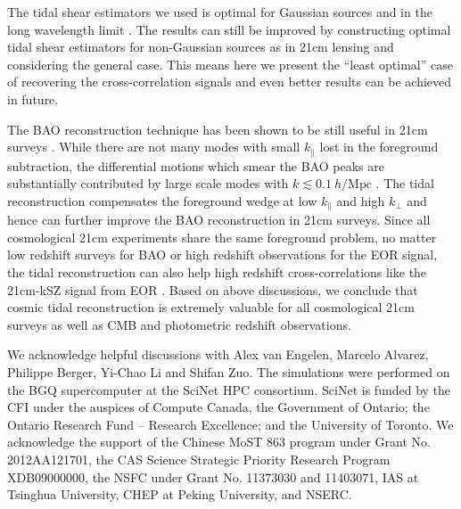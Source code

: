 \documentclass[aps,prl,twocolumn,showpacs,superscriptaddress,groupedaddress,nofootinbib]{revtex4}  %
\newcommand{\mr}{\mathrm}
\begin{document}
The tidal shear estimators we used is optimal for Gaussian sources and in the 
long wavelength limit \cite{2015:zhu}.
The results can still be improved by constructing optimal tidal shear 
estimators for non-Gaussian sources as in 21cm lensing \cite{2010:lu} and 
considering the general case. This means here we present the ``least optimal''
case of recovering the cross-correlation signals and even better results can be
achieved in future.

The BAO reconstruction technique \cite{2007:bao} has been shown to be still
useful in 21cm surveys \cite{2015:bao1}\cite{2015:bao2}. While there are not 
many modes with small $k_\parallel$ lost in the foreground subtraction, the 
differential motions which smear the BAO peaks are substantially contributed
by large scale modes with $k\lesssim0.1\ h/\mr{Mpc}$ \cite{2007:bao}.
The tidal reconstruction compensates the foreground wedge at low $k_\parallel$
and high $k_\perp$ and hence can further improve the BAO reconstruction in 
21cm surveys. Since all cosmological 21cm experiments share the same foreground
problem, no matter low redshift surveys for BAO or high redshift observations
for the EOR signal, the tidal reconstruction can also help high redshift 
cross-correlations like the 21cm-kSZ signal from EOR \cite{2015:marcelo}. Based
on above discussions, we conclude that cosmic tidal reconstruction is extremely
valuable for all cosmological 21cm surveys as well as CMB and photometric
redshift observations.

We acknowledge helpful discussions with Alex van Engelen, Marcelo Alvarez,
Philippe Berger, Yi-Chao Li and Shifan Zuo.
The simulations were performed on the BGQ supercomputer 
at the SciNet HPC consortium.
SciNet is funded by the CFI under the auspices of Compute Canada, 
the Government of Ontario; the Ontario Research Fund -- Research Excellence;
and the University of Toronto.
We acknowledge the support of the Chinese MoST 863 program under Grant 
No. 2012AA121701, the CAS Science Strategic Priority Research Program 
XDB09000000, the NSFC under Grant No. 11373030 and 11403071, IAS at 
Tsinghua University, CHEP at Peking University, and NSERC.



\end{document}
